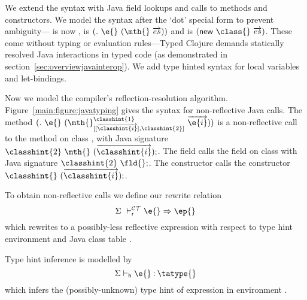 We extend the syntax with Java field lookups and calls to
methods and constructors. We model the syntax after the `dot' special
form to prevent ambiguity--- is now \fieldexp{\fld{}}{\e{}},
 is $\methodexp{\mth{}}{\e{}}{\overrightarrow{es}}$
and  is $\newexp{\class{}}{\overrightarrow{es}}$.
These come without typing or evaluation rules---Typed Clojure 
demands statically resolved Java interactions
in typed code
(as demonstrated in section~\ref{sec:overviewjavainterop}).
We add type hinted syntax for local variables and let-bindings.

Now we model the compiler's reflection-resolution algorithm.
Figure~\ref{main:figure:javatyping} gives the syntax for non-reflective Java calls.
The method ${\methodstaticexp {\classhint{1}}
                             {\overrightarrow {\classhint{i}}}
                             {\classhint{2}}
                             {\mth{}} {\e{}} {\overrightarrow{\e{i}}}}$
is a non-reflective call to the \mth{} method on class {}, 
with Java signature 
${\classhint{2}}\ \mth{}\ (\overrightarrow {\classhint{i}});$.
The field { {} {\fld{}} {\e{}}}
calls the field on class {} with Java signature
${\classhint{2}}\ \fld{};$.
The constructor { {\classhint{}} 
                               {\class{}} {}}
calls the constructor
${\classhint{}}\ ({\overrightarrow{\classhint{i}}});$.

%


To obtain non-reflective calls we define our rewrite relation
$$
\rewrite {\taenv{}} {\e{}} {\ep{}}
$$
which rewrites \e{} to a possibly-less reflective expression
\ep{} with respect to type hint environment
\taenv{} and Java class table \ct{}.

Type hint inference is modelled by
$$
\tajudgement {\taenv{}} {\hastype {\e{}} {\tatype{}}}
$$
which infers the (possibly-unknown) type hint \tatype{} of expression \e{} in environment \taenv{}.

